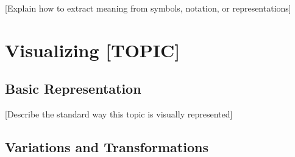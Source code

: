 \documentclass[12pt,letterpaper]{article}
\begin{document}
[Explain how to extract meaning from symbols, notation, or representations]

\begin{example}
\end{example}

\begin{solution}
\end{solution}


\section{Visualizing [TOPIC]}

\subsection{Basic Representation}

[Describe the standard way this topic is visually represented]


\subsection{Variations and Transformations}
\end{document}
